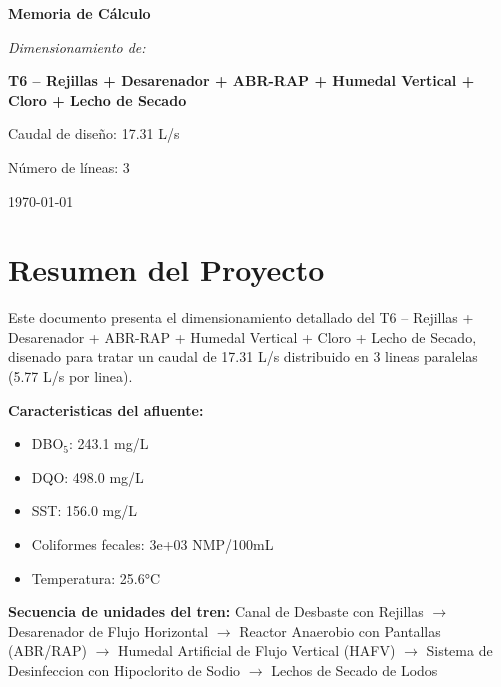 \documentclass[12pt,a4paper]{article}
\begin{document}
\begin{titlepage}
\centering
\vspace*{2cm}

{\Huge\bfseries Memoria de Cálculo\par}
\vspace{1.5cm}

{\Large\itshape Dimensionamiento de:\par}
\vspace{0.5cm}

{\LARGE\bfseries T6 – Rejillas + Desarenador + ABR-RAP + Humedal Vertical + Cloro + Lecho de Secado\par}
\vspace{2cm}

{\large Caudal de diseño: 17.31 L/s\par}
{\large Número de líneas: 3\par}
\vfill
{\large\today\par}
\end{titlepage}

\tableofcontents

\listoffigures

\listoftables

\newpage
\section{Resumen del Proyecto}

Este documento presenta el dimensionamiento detallado del T6 – Rejillas + Desarenador + ABR-RAP + Humedal Vertical + Cloro + Lecho de Secado, disenado para tratar un caudal de 17.31 L/s distribuido en 3 lineas paralelas (5.77 L/s por linea).

\textbf{Caracteristicas del afluente:}
\begin{itemize}
    \item DBO$_5$: 243.1 mg/L
    \item DQO: 498.0 mg/L
    \item SST: 156.0 mg/L
    \item Coliformes fecales: 3e+03 NMP/100mL
    \item Temperatura: 25.6°C
\end{itemize}

\textbf{Secuencia de unidades del tren:} 
Canal de Desbaste con Rejillas $\rightarrow$ Desarenador de Flujo Horizontal $\rightarrow$ Reactor Anaerobio con Pantallas (ABR/RAP) $\rightarrow$ Humedal Artificial de Flujo Vertical (HAFV) $\rightarrow$ Sistema de Desinfeccion con Hipoclorito de Sodio $\rightarrow$ Lechos de Secado de Lodos
\end{document}
